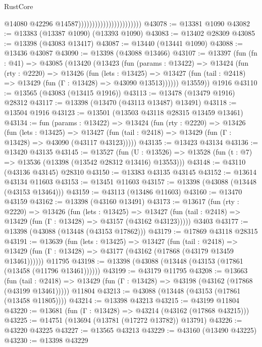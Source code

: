 \begin{lexlean}{RustCore}
\begin{coremodule}
                                                  @14080
                                                  @42296
                                                  @14587)))))))))))))))))))))))
@43078 := @13381 @1090
@43082 := @13383 (@13387 @1090) (@13393 @1090)
@43083 := @13402 @28309
@43085 := @13398 (@43083 @13417)
@43087 := @13440 (@13441 @1090)
@43088 := @13436 @43087
@43090 := @13398 (@43088 @13466)
@43107 := @13397
    (fun (fn : @41) =>
    @43085
      (@13420
        (@13423
          (fun (params : @13422) =>
          @13424
            (fun (rty : @2220) =>
            @13426
              (fun (lets : @13425) =>
              @13427 (fun (tail : @2418) => @13429 (fun (Γ : @13428) => @43090 @13513))))))
        @13559))
    @1916
@43110 := @13565 (@43083 (@13415 @1916))
@43113 := @13478 (@13479 @1916) @28312
@43117 := @13398 (@13470 (@43113 @13487) @13491)
@43118 := @13504 @1916
@43123 := @13501 (@13503 @43118 @28315 @13459 @13461)
@43134 := fun (params : @13422) =>
  @13424
    (fun (rty : @2220) =>
    @13426
      (fun (lets : @13425) =>
      @13427 (fun (tail : @2418) => @13429 (fun (Γ : @13428) => @43090 (@43117 @43123)))))
@43135 := @13423 @43134
@43136 := @13420 @43135
@43145 := @13527
    (fun (U : @13526) => @13528 (fun (t : @7) => @13536 (@13398 (@13542 @28312 @13416) @13553)))
@43148 := @43110 (@43136 @43145) @28310
@43150 := @13383 @43135 @43145
@43152 := @13614 @43134 @11603
@43153 := @13451 @11603
@43157 := @13398 (@43088 (@13448 (@43153 @13464)))
@43159 := @43113 (@13486 @11603)
@43160 := @13470 @43159
@43162 := @13398 (@43160 @13491)
@43173 := @13617
    (fun (rty : @2220) =>
    @13426
      (fun (lets : @13425) =>
      @13427 (fun (tail : @2418) => @13429 (fun (Γ : @13428) => @43157 (@43162 @43123)))))
    @3403
@43177 := @13398 (@43088 (@13448 (@43153 @17862)))
@43179 := @17869 @43118 @28315
@43191 := @13639
    (fun (lets : @13425) =>
    @13427
      (fun (tail : @2418) =>
      @13429 (fun (Γ : @13428) => @43177 (@43162 (@17868 (@43179 @13459 @13461))))))
    @11795
@43198 := @13398 (@43088 (@13448 (@43153 (@17861 (@13458 (@11796 @13461))))))
@43199 := @43179 @11795
@43208 := @13663
    (fun (tail : @2418) => @13429 (fun (Γ : @13428) => @43198 (@43162 (@17868 (@43199 @13461)))))
    @11804
@43213 := @43088 (@13448 (@43153 (@17861 (@13458 @11805))))
@43214 := @13398 @43213
@43215 := @43199 @11804
@43220 := @13681 (fun (Γ : @13428) => @43214 (@43162 (@17868 @43215)))
@43225 := @14751 (@13694 (@13781 (@17272 @13782)) @13791)
@43226 := @43220 @43225
@43227 := @13565 @43213
@43229 := @43160 (@13490 @43225)
@43230 := @13398 @43229

\end{coremodule}
\end{lexlean}
